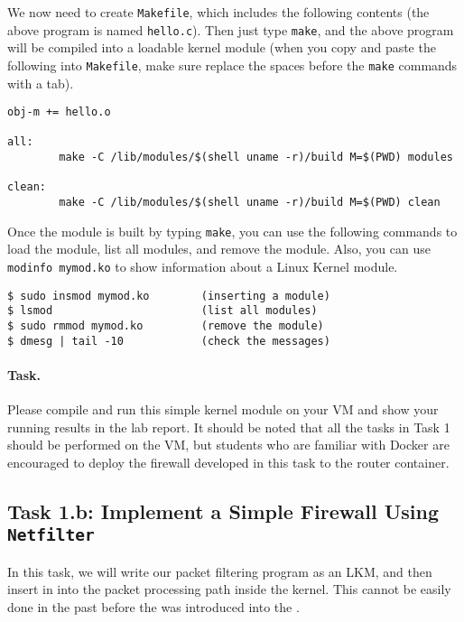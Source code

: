 We now need to create {\tt Makefile}, which includes the following
contents (the above program is named {\tt hello.c}). Then 
just type {\tt make}, and the above program will be compiled
into a loadable kernel module (when you copy and paste the following
into \texttt{Makefile}, make sure replace the spaces before the 
\texttt{make} commands with a tab).


\begin{lstlisting}
obj-m += hello.o

all:
        make -C /lib/modules/$(shell uname -r)/build M=$(PWD) modules

clean:
        make -C /lib/modules/$(shell uname -r)/build M=$(PWD) clean
\end{lstlisting}


Once the module is built by typing {\tt make}, you can use the following commands to 
load the module, list all modules, and remove the module. 
Also, you can use {\tt modinfo mymod.ko} to show information about a 
Linux Kernel module.

\begin{lstlisting}
$ sudo insmod mymod.ko        (inserting a module)
$ lsmod                       (list all modules)
$ sudo rmmod mymod.ko         (remove the module)
$ dmesg | tail -10            (check the messages)
\end{lstlisting}


\paragraph{Task.} Please compile and run this simple kernel module on 
your VM and show your running results in the lab report. 
It should be noted that all the tasks in Task 1 should be 
performed on the VM, but students who are familiar with Docker
are encouraged to deploy the firewall developed in this task
to the router container. 


\subsection{Task 1.b: Implement a Simple Firewall Using \texttt{Netfilter}}  


In this task, we will write our packet filtering program
as an LKM, and then insert in into the packet processing path
inside the kernel. This cannot be easily done in the past before 
the \Netfilter was introduced into the \linux.

